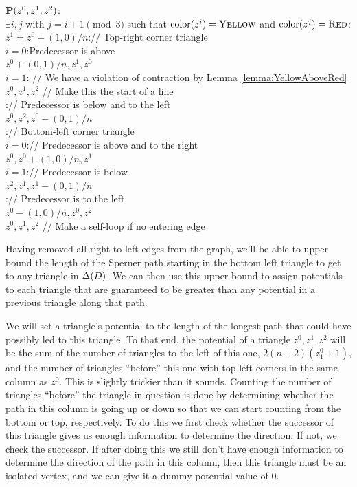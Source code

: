   \begin{algo}
    $\mathbf{P}(z^0,z^1,z^2)$:\+
    \\ \IfB $\exists i,j$ with $j = i + 1 \pmod{3}$ such that $\operatorname{color}(z^i) = \textsc{Yellow}$ and $\operatorname{color}(z^j) = \textsc{Red}$:\+
    \\   \IfB $z^1 = z^0 + (1,0)/n$:\quad // Top-right corner triangle\+    
    \\     \IfB $i = 0$:\quad Predecessor is above\+
    \\       \ReturnB $z^0+(0,1)/n,z^1,z^0$\-
    \\     \ElseIfB $i = 1$: \quad// We have a violation of contraction by Lemma \ref{lemma:YellowAboveRed}\+
    \\       \ReturnB $z^0,z^1,z^2$ \quad// Make this the start of a line\-
    \\     \ElseB:\quad // Predecessor is below and to the left\+
    \\       \ReturnB $z^0,z^2,z^0 - (0,1)/n$\-\-
    \\   \ElseB:\quad // Bottom-left corner triangle\+
    \\     \IfB $i = 0$:\quad // Predecessor is above and to the right\+
    \\       \ReturnB $z^0,z^0+(1,0)/n,z^1$\-
    \\     \ElseIfB $i = 1$:\quad // Predecessor is below\+ 
    \\       \ReturnB $z^2,z^1,z^1-(0,1)/n$\-
    \\     \ElseB:\quad // Predecessor is to the left\+
    \\       \ReturnB $z^0-(1,0)/n,z^0,z^2$\-\-\-
    \\ \ReturnB $z^0,z^1,z^2$ \quad// Make a self-loop if no entering edge
  \end{algo}
  
  Having removed all right-to-left edges from the \EOPL graph, we'll be able to upper bound the length of the Sperner path starting in the bottom left triangle to get to any triangle in $\Delta(D)$. We can then use this upper bound to assign potentials to each triangle that are guaranteed to be greater than any potential in a previous triangle along that path.

  We will set a triangle's potential to the length of the longest path that could have possibly led to this triangle. To that end, the potential of a triangle $z^0,z^1,z^2$ will be the sum of the number of triangles to the left of this one, $2(n+2)(z^0_1 + 1)$, and the number of triangles ``before'' this one with top-left corners in the same column as $z^0$. This is slightly trickier than it sounds. 
  Counting the number of triangles ``before'' the triangle in question is done by determining whether the path in this column is going up or down so that we can start counting from the bottom or top, respectively. To do this we first check whether the successor of this triangle gives us enough information to determine the direction. If not, we check the successor. If after doing this we still don't have enough information to determine the direction of the path in this column, then this triangle must be an isolated vertex, and we can give it a dummy potential value of $0$.

